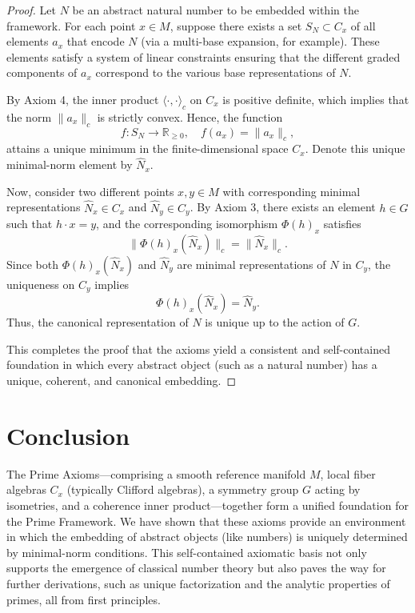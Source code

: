 \documentclass[12pt]{article}
\begin{document}
\begin{proof}
Let \(N\) be an abstract natural number to be embedded within the framework. For each point \(x \in M\), suppose there exists a set \(S_N \subset C_x\) of all elements \(a_x\) that encode \(N\) (via a multi-base expansion, for example). These elements satisfy a system of linear constraints ensuring that the different graded components of \(a_x\) correspond to the various base representations of \(N\).

By Axiom 4, the inner product \(\langle \cdot, \cdot \rangle_c\) on \(C_x\) is positive definite, which implies that the norm \(\|a_x\|_c\) is strictly convex. Hence, the function
\[
f : S_N \to \mathbb{R}_{\ge 0}, \quad f(a_x) = \|a_x\|_c,
\]
attains a unique minimum in the finite-dimensional space \(C_x\). Denote this unique minimal-norm element by \(\hat{N}_x\).

Now, consider two different points \(x, y \in M\) with corresponding minimal representations \(\hat{N}_x \in C_x\) and \(\hat{N}_y \in C_y\). By Axiom 3, there exists an element \(h \in G\) such that \(h \cdot x = y\), and the corresponding isomorphism \(\Phi(h)_x\) satisfies
\[
\|\Phi(h)_x(\hat{N}_x)\|_c = \|\hat{N}_x\|_c.
\]
Since both \(\Phi(h)_x(\hat{N}_x)\) and \(\hat{N}_y\) are minimal representations of \(N\) in \(C_y\), the uniqueness on \(C_y\) implies
\[
\Phi(h)_x(\hat{N}_x) = \hat{N}_y.
\]
Thus, the canonical representation of \(N\) is unique up to the action of \(G\).

This completes the proof that the axioms yield a consistent and self-contained foundation in which every abstract object (such as a natural number) has a unique, coherent, and canonical embedding.
\end{proof}

\section{Conclusion}
The Prime Axioms—comprising a smooth reference manifold \(M\), local fiber algebras \(C_x\) (typically Clifford algebras), a symmetry group \(G\) acting by isometries, and a coherence inner product—together form a unified foundation for the Prime Framework. We have shown that these axioms provide an environment in which the embedding of abstract objects (like numbers) is uniquely determined by minimal-norm conditions. This self-contained axiomatic basis not only supports the emergence of classical number theory but also paves the way for further derivations, such as unique factorization and the analytic properties of primes, all from first principles.
\end{document}
